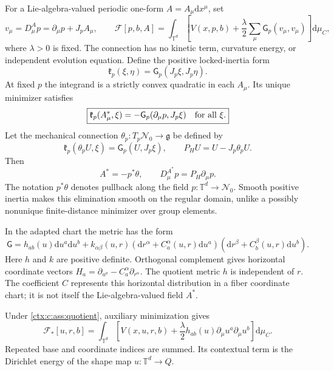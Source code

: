For a Lie-algebra-valued periodic one-form $A=A_\mu\mathrm d x^\mu$, set
\begin{equation}
 v_\mu=D^A_\mu p=\partial_\mu p+J_pA_\mu,
 \qquad
 \mathcal F[p,b,A]=\int_{\mathbb T^d}
 \left[V(x,p,b)+\frac\lambda2\sum_\mu\mathsf G_p(v_\mu,v_\mu)\right]\mathrm d\mu_C,
 \label{ctx:c:eq:unreduced}
\end{equation}
where $\lambda>0$ is fixed. The connection has no kinetic term, curvature energy, or independent evolution equation. Define the positive locked-inertia form
\begin{equation}
 \mathfrak k_p(\xi,\eta)=\mathsf G_p(J_p\xi,J_p\eta).
\end{equation}
At fixed $p$ the integrand is a strictly convex quadratic in each $A_\mu$. Its unique minimizer satisfies
\begin{equation}
 \boxed{\mathfrak k_p(A^*_\mu,\xi)
             =-\mathsf G_p(\partial_\mu p,J_p\xi)\quad\hbox{for all }\xi.}
 \label{ctx:c:eq:normal}
\end{equation}
Let the mechanical connection $\theta_p:T_p\mathcal N_0\to\mathfrak g$ be defined by
\begin{equation}
 \mathfrak k_p(\theta_pU,\xi)=\mathsf G_p(U,J_p\xi),
 \qquad P_HU=U-J_p\theta_pU.
\end{equation}
Then
\begin{equation}
 A^*=-p^*\theta,\qquad D^{A^*}_\mu p=P_H\partial_\mu p.
 \label{ctx:c:eq:mechanical}
\end{equation}
The notation $p^*\theta$ denotes pullback along the field $p:\mathbb T^d\to\mathcal N_0$. Smooth positive inertia makes this elimination smooth on the regular domain, unlike a possibly nonunique finite-distance minimizer over group elements.

In the adapted chart the metric has the form
\begin{equation}
 \mathsf G=h_{ab}(u)\mathrm d u^a\mathrm d u^b+
 k_{\alpha\beta}(u,r)
 (\mathrm d r^\alpha+C^\alpha_a(u,r)\mathrm d u^a)
 (\mathrm d r^\beta+C^\beta_b(u,r)\mathrm d u^b).
 \label{ctx:c:eq:metricdecomp}
\end{equation}
Here $h$ and $k$ are positive definite. Orthogonal complement gives horizontal coordinate vectors $H_a=\partial_{u^a}-C^\alpha_a\partial_{r^\alpha}$. The quotient metric $h$ is independent of $r$. The coefficient $C$ represents this horizontal distribution in a fiber coordinate chart; it is not itself the Lie-algebra-valued field $A^*$.

Under \cref{ctx:c:ass:quotient}, auxiliary minimization gives
\begin{equation}
 \boxed{\mathcal F_*[u,r,b]=\int_{\mathbb T^d}
 \left[V(x,u,r,b)+\frac\lambda2h_{ab}(u)
                   \partial_\mu u^a\partial_\mu u^b\right]\mathrm d\mu_C.}
 \label{ctx:c:eq:reduced}
\end{equation}
Repeated base and coordinate indices are summed. Its contextual term is the Dirichlet energy of the shape map $u:\mathbb T^d\to Q$.

